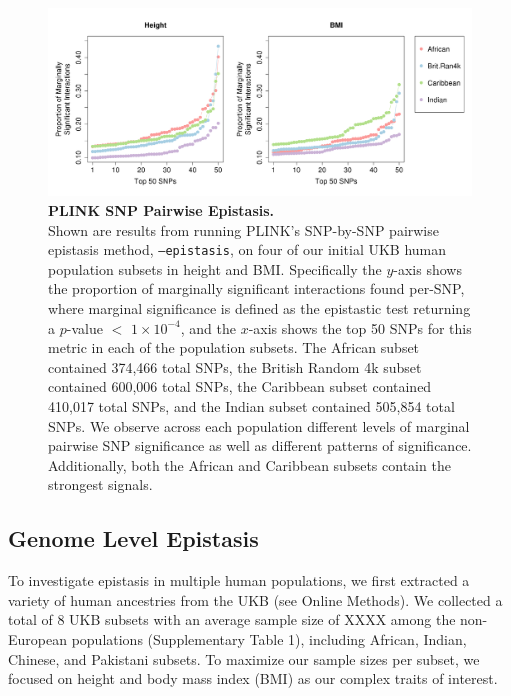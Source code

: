 \documentclass[12pt, a4paper]{article}
\begin{document}
\begin{figure}[t]
\centering
\includegraphics[scale=.35]{Images/InterPath_Suppl_Figure_PLINK_vs2.png}
\caption[PLINK SNP Pairwise Epistasis]{\textbf{PLINK SNP Pairwise Epistasis.} \\ Shown are results from running PLINK's SNP-by-SNP pairwise epistasis method, \texttt{--epistasis}, on four of our initial UKB human population subsets in height and BMI. Specifically the $y$-axis shows the proportion of marginally significant interactions found per-SNP, where marginal significance is defined as the epistastic test returning a $p$-value $<$ $1\times10^{-4}$, and the $x$-axis shows the top 50 SNPs for this metric in each of the population subsets. The African subset contained 374,466 total SNPs, the British Random 4k subset contained 600,006 total SNPs, the Caribbean subset contained 410,017 total SNPs, and the Indian subset contained 505,854 total SNPs. We observe across each population different levels of marginal pairwise SNP significance as well as different patterns of significance. Additionally, both the African and Caribbean subsets contain the strongest signals.}
\label{InterPath-Suppl-Figure-PLINK}
\end{figure}

\subsection{Genome Level Epistasis}\label{InterPath-Results-GenomeEpistasis}

To investigate epistasis in multiple human populations, we first extracted a variety of human ancestries from the UKB (see Online Methods). We collected a total of 8 UKB subsets with an average sample size of XXXX among the non-European populations (Supplementary Table 1), including African, Indian, Chinese, and Pakistani subsets. To maximize our sample sizes per subset, we focused on height and body mass index (BMI) as our complex traits of interest. 
\end{document}
